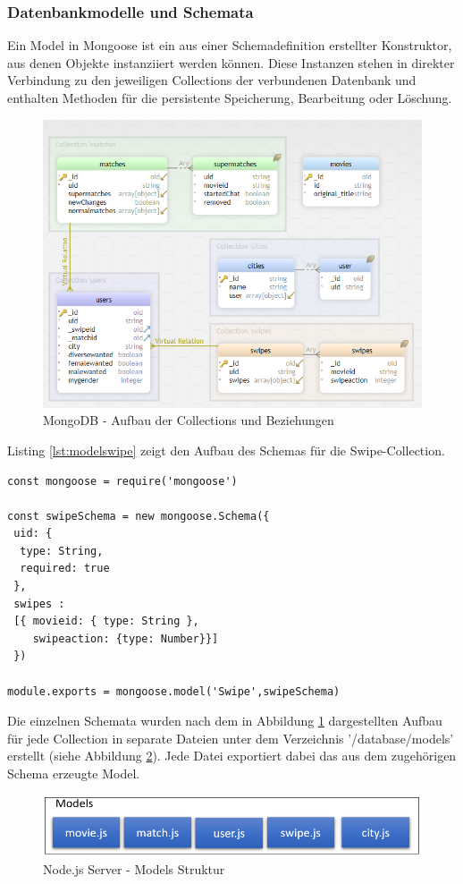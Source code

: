 \subsubsection{Datenbankmodelle und Schemata}
Ein Model in Mongoose ist ein aus einer Schemadefinition erstellter Konstruktor, aus denen Objekte instanziiert werden können. Diese Instanzen stehen in direkter Verbindung zu den jeweiligen Collections der verbundenen Datenbank und enthalten Methoden für die persistente Speicherung, Bearbeitung oder Löschung.

\begin{figure}[tbt]
\centering
\includegraphics[width=\textwidth]{images/databasemodells.PNG}
\caption{MongoDB - Aufbau der Collections und Beziehungen}
\label{fig:databasemodells}
\end{figure}

\noindent
Listing \ref{lst:modelswipe} zeigt den Aufbau des Schemas für die Swipe-Collection. \\

\begin{lstlisting}[caption=Swipe Schema und Model, label=lst:modelswipe]
const mongoose = require('mongoose')

const swipeSchema = new mongoose.Schema({
 uid: {
  type: String,
  required: true
 },
 swipes :
 [{ movieid: { type: String },
    swipeaction: {type: Number}}]
 })

module.exports = mongoose.model('Swipe',swipeSchema)
\end{lstlisting}

\noindent
Die einzelnen Schemata wurden nach dem in  Abbildung \ref{fig:databasemodells} dargestellten Aufbau für jede Collection in separate Dateien unter dem Verzeichnis '/database/models' erstellt (siehe Abbildung \ref{fig:node_structure}). Jede Datei exportiert dabei das aus dem zugehörigen Schema erzeugte Model.

\begin{figure}[tbt]
\centering
\includegraphics[width=12cm]{images/modelsstruktur.PNG}
\caption{Node.js Server - Models Struktur}
\label{fig:node_structure}
\end{figure}
